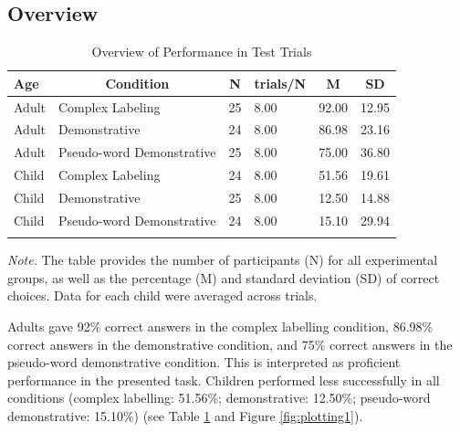 \documentclass[
  man,floatsintext]{apa6}
\begin{document}
\subsection{Overview}\label{overview}

\begin{table}[ht]

\begin{center}
\begin{threeparttable}

\caption{\label{tab:overviewtab}Overview of Performance in Test Trials}

\footnotesize{

\begin{tabular}{llllll}
\toprule
Age & \multicolumn{1}{c}{Condition} & \multicolumn{1}{c}{N} & \multicolumn{1}{c}{trials/N} & \multicolumn{1}{c}{M} & \multicolumn{1}{c}{SD}\\
\midrule
Adult & Complex Labeling & 25 & 8.00 & 92.00 & 12.95\\
Adult & Demonstrative & 24 & 8.00 & 86.98 & 23.16\\
Adult & Pseudo-word Demonstrative & 25 & 8.00 & 75.00 & 36.80\\
Child & Complex Labeling & 24 & 8.00 & 51.56 & 19.61\\
Child & Demonstrative & 25 & 8.00 & 12.50 & 14.88\\
Child & Pseudo-word Demonstrative & 24 & 8.00 & 15.10 & 29.94\\
\bottomrule
\addlinespace
\end{tabular}

}

\begin{tablenotes}[para]
\normalsize{\textit{Note.} The table provides the number of participants (N) for all experimental groups, as well as the percentage (M) and standard deviation (SD) of correct choices. Data for each child were averaged across trials.}
\end{tablenotes}

\end{threeparttable}
\end{center}

\end{table}

Adults gave 92\% correct answers in the complex labelling condition, 86.98\% correct answers in the demonstrative condition, and 75\% correct answers in the pseudo-word demonstrative condition. This is interpreted as proficient performance in the presented task. Children performed less successfully in all conditions (complex labelling: 51.56\%; demonstrative: 12.50\%; pseudo-word demonstrative: 15.10\%) (see Table \ref{tab:overviewtab} and Figure \ref{fig:plotting1}).
\end{document}
